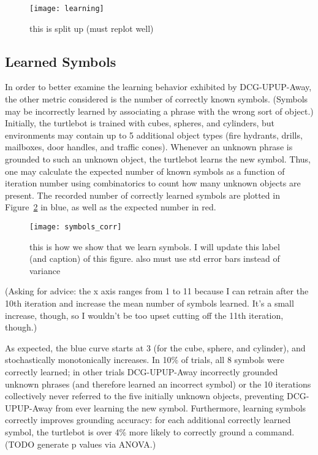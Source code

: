 \begin{figure}[h]
\centering
\texttt{[image: learning]}
\caption{this is split up (must replot well)}
\label{fig:g_acc_split}
\end{figure}


\subsection{Learned Symbols}
In order to better examine the learning behavior exhibited by DCG-UPUP-Away, the other metric considered is the number of correctly known symbols.
(Symbols may be incorrectly learned by associating a phrase with the wrong sort of object.)
Initially, the turtlebot is trained with cubes, spheres, and cylinders, but environments may contain up to 5 additional object types (fire hydrants, drills, mailboxes, door handles, and traffic cones).
Whenever an unknown phrase is grounded to such an unknown object, the turtlebot learns the new symbol.
Thus, one may calculate the expected number of known symbols as a function of iteration number using combinatorics to count how many unknown objects are present.
The recorded number of correctly learned symbols are plotted in Figure~\ref{fig:symbols} in blue, as well as the expected number in red.\\
\begin{figure}[h]
\centering
\texttt{[image: symbols\_corr]}
\caption{this is how we show that we learn symbols. I will update this label (and caption) of this figure. also must use std error bars instead of variance}
\label{fig:symbols}
\end{figure}
(Asking for advice: the x axis ranges from 1 to 11 because I can retrain after the 10th iteration and increase the mean number of symbols learned. It's a small increase, though, so I wouldn't be too upset cutting off the 11th iteration, though.)

As expected, the blue curve starts at 3 (for the cube, sphere, and cylinder), and stochastically monotonically increases.
In 10\% of trials, all 8 symbols were correctly learned; in other trials DCG-UPUP-Away incorrectly grounded unknown phrases (and therefore learned an incorrect symbol) or the 10 iterations collectively never referred to the five initially unknown objects, preventing DCG-UPUP-Away from ever learning the new symbol.
Furthermore, learning symbols correctly improves grounding accuracy: for each additional correctly learned symbol, the turtlebot is over 4\% more likely to correctly ground a command. (TODO generate p values via ANOVA.)

